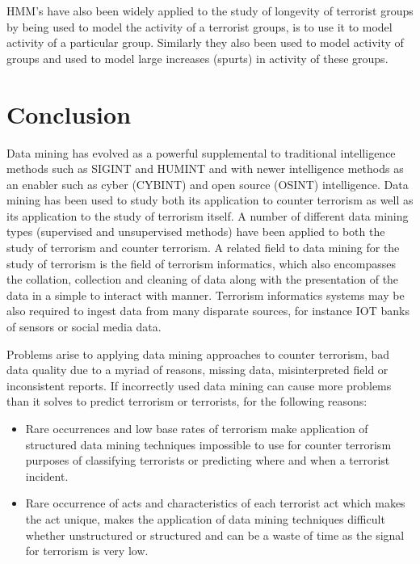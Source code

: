HMM’s \citep{allanach2004detecting}  have also been widely applied to the study of longevity of terrorist groups by being used to model the activity of a terrorist groups, is to use it to model activity of a particular group. Similarly they also been used to model activity of groups and used to model large increases (spurts) in activity of these groups. 

\section{Conclusion}

Data mining has evolved as a powerful supplemental to traditional intelligence methods such as SIGINT and HUMINT and with newer intelligence methods as an enabler  such as cyber (CYBINT) and open source (OSINT) intelligence. 
Data mining has been used to study both its application to counter terrorism as well as its application to the study of terrorism itself. A number of different data mining types (supervised and unsupervised methods) have been applied to both the study of terrorism and counter terrorism. A related field to data mining for the study of terrorism is the field of terrorism informatics, which also encompasses the collation, collection and cleaning of data along with the presentation of the data in a simple to interact with manner. Terrorism informatics systems may be also required to ingest data from many disparate sources, for instance IOT banks of sensors or social media data.

Problems arise to applying data mining approaches to counter terrorism, bad data quality due to a myriad of reasons, missing data, misinterpreted field or inconsistent reports.
If incorrectly used data mining can cause more problems than it solves to predict terrorism or terrorists, for the following reasons:
\begin{itemize}
\item Rare occurrences and low base rates of terrorism make application of structured data mining techniques impossible to use for counter terrorism purposes of classifying terrorists or predicting where and when a terrorist incident.
\item Rare occurrence of acts and characteristics of each terrorist act which  makes the act unique, makes the application of data mining techniques difficult whether unstructured or structured and can be a waste of time as the signal for terrorism is very low.
\end{itemize}

